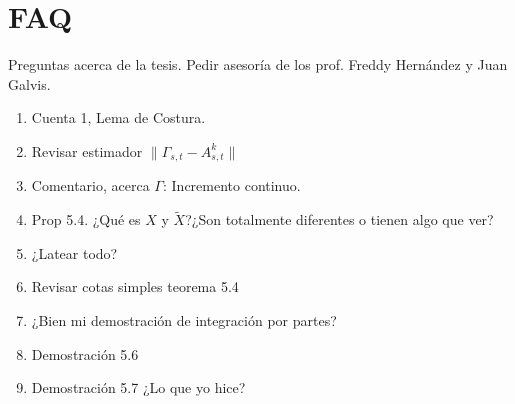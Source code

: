 
\section{FAQ}

Preguntas acerca de la tesis. Pedir asesoría de los prof. Freddy Hernández y Juan Galvis.

\begin{enumerate}
	
	\item Cuenta 1, Lema de Costura.
	\item Revisar estimador $\lVert \Gamma_{s,t} - A^k_{s,t} \rVert$
	\item Comentario, acerca $\Gamma$: Incremento continuo.

	\item Prop 5.4. ¿Qué es $X$ y $\tilde{X}$?¿Son totalmente diferentes o tienen algo que ver?
	\item ¿Latear todo?
	\item Revisar cotas simples teorema 5.4

	\item ¿Bien mi demostración de integración por partes?
	\item Demostración 5.6
	\item Demostración 5.7 ¿Lo que yo hice?
\end{enumerate}
